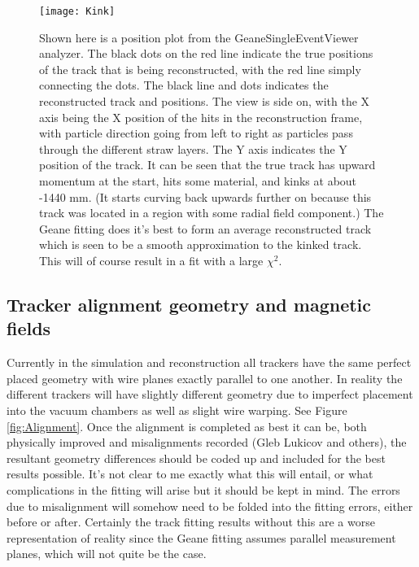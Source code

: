 			\begin{figure}[]
				\caption{Shown here is a position plot from the GeaneSingleEventViewer analyzer. The black dots on the red line indicate the true positions of the track that is being reconstructed, with the red line simply connecting the dots. The black line and dots indicates the reconstructed track and positions. The view is side on, with the X axis being the X position of the hits in the reconstruction frame, with particle direction going from left to right as particles pass through the different straw layers. The Y axis indicates the Y position of the track. It can be seen that the true track has upward momentum at the start, hits some material, and kinks at about -1440 mm. (It starts curving back upwards further on because this track was located in a region with some radial field component.) The Geane fitting does it's best to form an average reconstructed track which is seen to be a smooth approximation to the kinked track. This will of course result in a fit with a large $\chi^{2}$.}
				\centering
				\texttt{[image: Kink]}
				\label{fig:Kink}
			\end{figure}

	\subsection{Tracker alignment geometry and magnetic fields}

		Currently in the simulation and reconstruction all trackers have the same perfect placed geometry with wire planes exactly parallel to one another. In reality the different trackers will have slightly different geometry due to imperfect placement into the vacuum chambers as well as slight wire warping. See Figure \ref{fig:Alignment}. Once the alignment is completed as best it can be, both physically improved and misalignments recorded (Gleb Lukicov and others), the resultant geometry differences should be coded up and included for the best results possible. It's not clear to me exactly what this will entail, or what complications in the fitting will arise but it should be kept in mind. The errors due to misalignment will somehow need to be folded into the fitting errors, either before or after. Certainly the track fitting results without this are a worse representation of reality since the Geane fitting assumes parallel measurement planes, which will not quite be the case.

